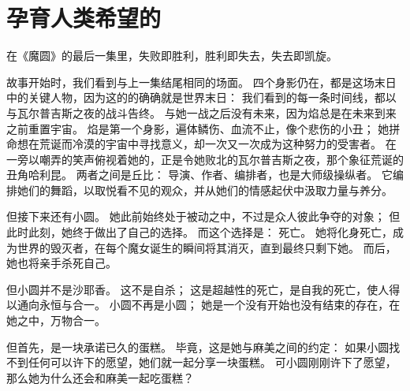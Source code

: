 \chapter[孕育人类希望的]{孕育人类希望的}



在《魔圆》的最后一集里，失败即胜利，胜利即失去，失去即凯旋。

故事开始时，我们看到与上一集结尾相同的场面。
四个身影仍在，都是这场末日中的关键人物，因为这的的确确就是世界末日：
我们看到的每一条时间线，都以与瓦尔普吉斯之夜的战斗告终。
与她一战之后没有未来，因为焰总是在未来到来之前重置宇宙。
焰是第一个身影，遍体鳞伤、血流不止，像个悲伤的小丑；
她拼命想在荒诞而冷漠的宇宙中寻找意义，却一次又一次成为这种努力的受害者。
在一旁以嘲弄的笑声俯视着她的，正是令她败北的瓦尔普吉斯之夜，那个象征荒诞的丑角哈利昆。
两者之间是丘比：
导演、作者、编排者，也是大师级操纵者。
它编排她们的舞蹈，以取悦看不见的观众，并从她们的情感起伏中汲取力量与养分。

但接下来还有小圆。
她此前始终处于被动之中，不过是众人彼此争夺的对象；
但此时此刻，她终于做出了自己的选择。
而这个选择是：
死亡。
她将化身死亡，成为世界的毁灭者，在每个魔女诞生的瞬间将其消灭，直到最终只剩下她。
而后，她也将亲手杀死自己。

但小圆并不是沙耶香。
这不是自杀；
这是超越性的死亡，是自我的死亡，使人得以通向永恒与合一\cite{smart1998buddhism}。
小圆不再是小圆；
她是一个没有开始也没有结束的存在，在她之中，万物合一。

但首先，是一块承诺已久的蛋糕。
毕竟，这是她与麻美之间的约定：
如果小圆找不到任何可以许下的愿望，她们就一起分享一块蛋糕。
可小圆刚刚许下了愿望，那么她为什么还会和麻美一起吃蛋糕？

